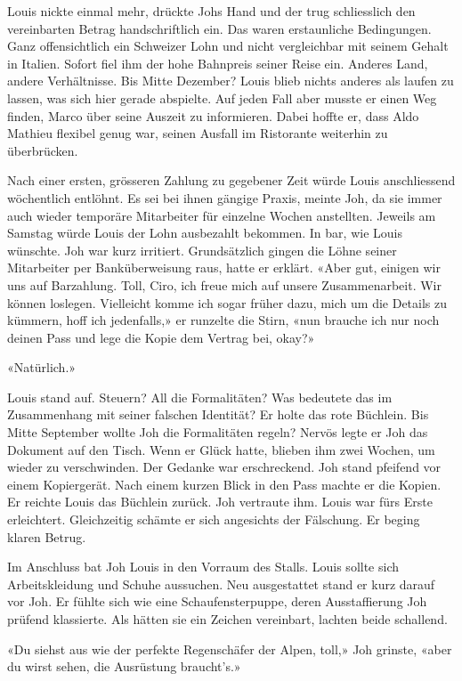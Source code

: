 Louis nickte einmal mehr, drückte Johs Hand und der trug schliesslich den vereinbarten Betrag
handschriftlich ein. Das waren erstaunliche Bedingungen. Ganz offensichtlich ein Schweizer Lohn 
und nicht vergleichbar mit seinem Gehalt in Italien. Sofort fiel ihm 
der hohe Bahnpreis seiner Reise ein. Anderes Land, andere Verhältnisse. 
Bis Mitte Dezember? Louis blieb nichts anderes als laufen zu lassen, was sich hier gerade abspielte. Auf jeden Fall aber musste er einen Weg finden, Marco über seine Auszeit zu informieren. Dabei hoffte er, dass Aldo Mathieu flexibel genug war, seinen Ausfall im Ristorante weiterhin zu überbrücken.

Nach einer ersten, grösseren Zahlung zu gegebener Zeit würde Louis anschliessend wöchentlich entlöhnt. Es sei bei ihnen gängige Praxis,
meinte Joh, da sie immer auch wieder temporäre Mitarbeiter für einzelne
Wochen anstellten. Jeweils am Samstag würde Louis der Lohn ausbezahlt
bekommen. In bar, wie Louis wünschte. Joh war kurz irritiert. Grundsätzlich gingen die Löhne seiner Mitarbeiter per Banküberweisung raus, hatte er erklärt. 
«Aber gut, einigen wir uns auf Barzahlung. Toll, Ciro, ich freue mich auf unsere Zusammenarbeit. Wir können loslegen. Vielleicht komme ich sogar früher dazu, mich um die Details zu kümmern, hoff ich jedenfalls,» er runzelte die Stirn, «nun brauche ich nur noch deinen Pass und lege die Kopie dem Vertrag bei, okay?»

«Natürlich.»

Louis stand auf. Steuern? All die Formalitäten? Was bedeutete das im Zusammenhang mit seiner falschen Identität? Er holte das rote Büchlein. Bis Mitte September wollte Joh die Formalitäten regeln? Nervös legte
er Joh das Dokument auf den Tisch. Wenn er Glück hatte, blieben ihm zwei Wochen, um wieder zu verschwinden. Der Gedanke war erschreckend. Joh stand pfeifend vor einem
Kopiergerät. Nach einem kurzen Blick in den Pass machte er die Kopien.
Er reichte Louis das Büchlein zurück. Joh vertraute ihm. Louis war fürs Erste 
erleichtert. Gleichzeitig schämte er sich angesichts der Fälschung. Er
beging klaren Betrug. 

Im Anschluss bat Joh Louis in den Vorraum des Stalls. Louis sollte sich
Arbeitskleidung und Schuhe aussuchen.
Neu ausgestattet stand er kurz darauf vor Joh. Er fühlte sich wie eine
Schaufensterpuppe, deren Ausstaffierung Joh prüfend klassierte. Als
hätten sie ein Zeichen vereinbart, lachten beide schallend.

«Du siehst aus wie der perfekte Regenschäfer der Alpen, toll,» Joh
grinste, «aber du wirst sehen, die Ausrüstung braucht’s.»

